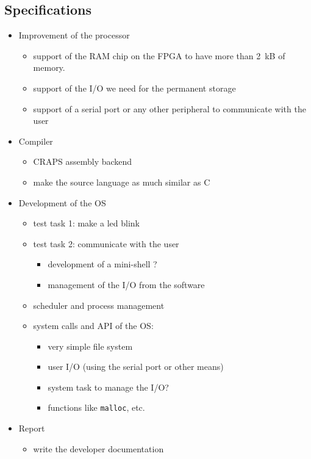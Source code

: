 \documentclass{article}
\begin{document}
  \newpage
  \begin{appendix}
    \section{Specifications}
      \begin{itemize}
        \item Improvement of the processor
          \begin{itemize}
            \item support of the RAM chip on the FPGA to have more than
              \SI{2}{kB} of memory.
            \item support of the I/O we need for the permanent storage
            \item support of a serial port or any other peripheral to
              communicate with the user
          \end{itemize}
        \item Compiler
          \begin{itemize}
            \item CRAPS assembly backend
            \item make the source language as much similar as C
          \end{itemize}
          \item Development of the OS
            \begin{itemize}
              \item test task 1: make a led blink
              \item test task 2: communicate with the user
                \begin{itemize}
                  \item development of a mini-shell ?
                  \item management of the I/O from the software
                \end{itemize}
              \item scheduler and process management
              \item system calls and API of the OS:
                \begin{itemize}
                  \item very simple file system
                  \item user I/O (using the serial port or other means)
                  \item system task to manage the I/O?
                  \item functions like \verb+malloc+, etc.
                \end{itemize}
            \end{itemize}
        \item Report
          \begin{itemize}
            \item write the developer documentation
          \end{itemize}
      \end{itemize}
  \end{appendix}
\end{document}
